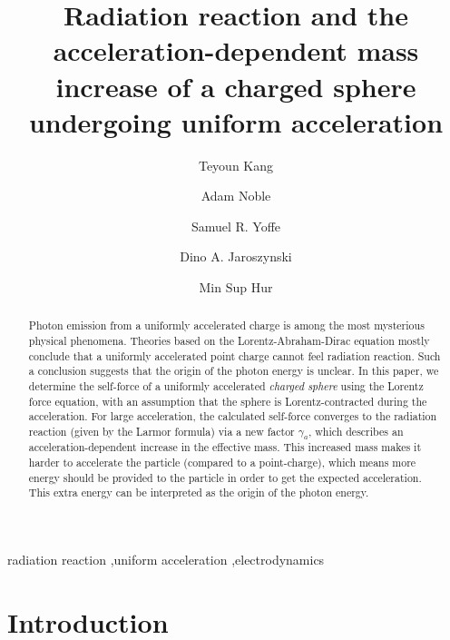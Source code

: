 \documentclass[a4paper,fleqn]{cas-sc}
\begin{document}
\title [mode = title]{Radiation reaction and the acceleration-dependent mass increase of a charged sphere undergoing uniform acceleration}


\author[1]{Teyoun Kang}

\address[1]{School of Natural Science, UNIST, 50 UNIST-gil, Ulju-gun, Ulsan, 44919, Korea}

\author[2]{Adam Noble}

\address[2]{Department of Physics, SUPA and University of Strathclyde, Glasgow G4 0NG, United Kingdom}

\author[2]{Samuel R. Yoffe}

\author[2]{Dino A. Jaroszynski}

\author[1]{Min Sup Hur}
\cormark[1]


\begin{abstract}
Photon emission from a uniformly accelerated charge is among the most mysterious physical phenomena. Theories based on the Lorentz-Abraham-Dirac equation mostly conclude that a uniformly accelerated point charge cannot feel radiation reaction. Such a conclusion suggests that the origin of the photon energy is unclear. In this paper, we determine the self-force of a uniformly accelerated \textit{charged sphere} using the Lorentz force equation, with an assumption that the sphere is Lorentz-contracted during the acceleration. For large acceleration, the calculated self-force converges to the radiation reaction (given by the Larmor formula) via a new factor $\gamma_{a}$, which describes an acceleration-dependent increase in the effective mass. This increased mass makes it harder to accelerate the particle (compared to a point-charge), which means more energy should be provided to the particle in order to get the expected acceleration. This extra energy can be interpreted as the origin of the photon energy.
\end{abstract}

\begin{keywords}
radiation reaction \sep uniform acceleration \sep electrodynamics 
\end{keywords}


\maketitle

\section{Introduction}
\end{document}
